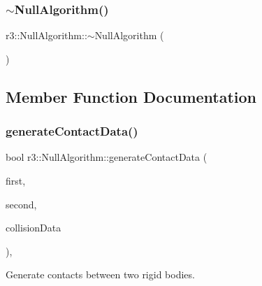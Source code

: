 \mbox{\label{classr3_1_1_null_algorithm_af077d1e0ad55f18634d59b5fb2b3ed30}} 
\subsubsection{\texorpdfstring{$\sim$\+Null\+Algorithm()}{~NullAlgorithm()}}
{\footnotesize\ttfamily r3\+::\+Null\+Algorithm\+::$\sim$\+Null\+Algorithm (\begin{DoxyParamCaption}{ }\end{DoxyParamCaption})\hspace{0.3cm}{\ttfamily [default]}}



\subsection{Member Function Documentation}
\mbox{\label{classr3_1_1_null_algorithm_ab7e9b0f244b44524d998497a6d47de19}} 
\subsubsection{\texorpdfstring{generate\+Contact\+Data()}{generateContactData()}}
{\footnotesize\ttfamily bool r3\+::\+Null\+Algorithm\+::generate\+Contact\+Data (\begin{DoxyParamCaption}\item[{\mbox{\hyperlink{classr3_1_1_rigid_body}{Rigid\+Body}} $\ast$}]{first,  }\item[{\mbox{\hyperlink{classr3_1_1_rigid_body}{Rigid\+Body}} $\ast$}]{second,  }\item[{\mbox{\hyperlink{classr3_1_1_collision_data}{Collision\+Data}} \&}]{collision\+Data }\end{DoxyParamCaption})\hspace{0.3cm}{\ttfamily [override]}, {\ttfamily [virtual]}}



Generate contacts between two rigid bodies. 


